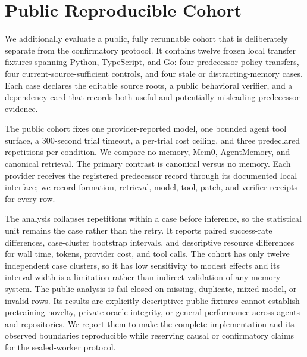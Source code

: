 \section{Public Reproducible Cohort}

We additionally evaluate a public, fully rerunnable cohort that is deliberately
separate from the confirmatory protocol. It contains twelve frozen local
transfer fixtures spanning Python, TypeScript, and Go: four predecessor-policy
transfers, four current-source-sufficient controls, and four stale or
distracting-memory cases. Each case declares the editable source roots, a
public behavioral verifier, and a dependency card that records both useful and
potentially misleading predecessor evidence.

The public cohort fixes one provider-reported model, one bounded agent tool
surface, a 300-second trial timeout, a per-trial cost ceiling, and three
predeclared repetitions per condition. We compare no memory, Mem0,
AgentMemory, and canonical \memorix{} retrieval. The primary contrast is
canonical \memorix{} versus no memory. Each provider receives the registered
predecessor record through its documented local interface; we record formation,
retrieval, model, tool, patch, and verifier receipts for every row.

The analysis collapses repetitions within a case before inference, so the
statistical unit remains the case rather than the retry. It reports paired
success-rate differences, case-cluster bootstrap intervals, and descriptive
resource differences for wall time, tokens, provider cost, and tool calls. The
cohort has only twelve independent case clusters, so it has low sensitivity to
modest effects and its interval width is a limitation rather than indirect
validation of any memory system. The
public analysis is fail-closed on missing, duplicate, mixed-model, or invalid
rows. Its results are explicitly descriptive: public fixtures cannot establish
pretraining novelty, private-oracle integrity, or general performance across
agents and repositories. We report them to make the complete implementation
and its observed boundaries reproducible while reserving causal or confirmatory
claims for the sealed-worker protocol.

